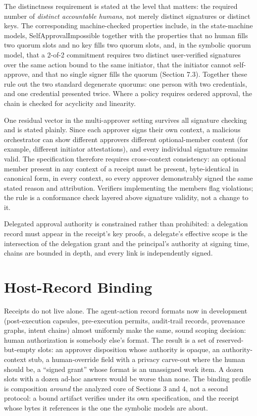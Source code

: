 \documentclass[11pt]{article}
\begin{document}
The distinctness requirement is stated at the level that matters: the required
number of \emph{distinct accountable humans}, not merely distinct signatures or
distinct keys. The corresponding machine-checked properties include, in the
state-machine models, SelfApprovalImpossible together with the properties that no
human fills two quorum slots and no key fills two quorum slots, and, in the
symbolic quorum model, that a 2-of-2 commitment requires two distinct
user-verified signatures over the same action bound to the same initiator, that
the initiator cannot self-approve, and that no single signer fills the quorum
(Section 7.3). Together these rule out the two standard degenerate quorums: one
person with two credentials, and one credential presented twice. Where a policy
requires ordered approval, the chain is checked for acyclicity and linearity.

One residual vector in the multi-approver setting survives all signature checking
and is stated plainly. Since each approver signs their own context, a malicious
orchestrator can show different approvers different optional-member content (for
example, different initiator attestations), and every individual signature remains
valid. The specification therefore requires cross-context consistency: an optional
member present in any context of a receipt must be present, byte-identical in
canonical form, in every context, so every approver demonstrably signed the same
stated reason and attribution. Verifiers implementing the members flag violations;
the rule is a conformance check layered above signature validity, not a change to
it.

Delegated approval authority is constrained rather than prohibited: a delegation
record must appear in the receipt's key proofs, a delegate's effective scope is
the intersection of the delegation grant and the principal's authority at signing
time, chains are bounded in depth, and every link is independently signed.

\section{Host-Record Binding}

Receipts do not live alone. The agent-action record formats now in development
(post-execution capsules, pre-execution permits, audit-trail records, provenance
graphs, intent chains) almost uniformly make the same, sound scoping decision:
human authorization is somebody else's format. The result is a set of
reserved-but-empty slots: an approver disposition whose authority is opaque, an
authority-context stub, a human-override field with a privacy carve-out where the
human should be, a ``signed grant'' whose format is an unassigned work item. A
dozen slots with a dozen ad-hoc answers would be worse than none. The binding
profile is composition \emph{around} the analyzed core of Sections 3 and 4, not a
second protocol: a bound artifact verifies under its own specification, and the
receipt whose bytes it references is the one the symbolic models are about.
\end{document}
